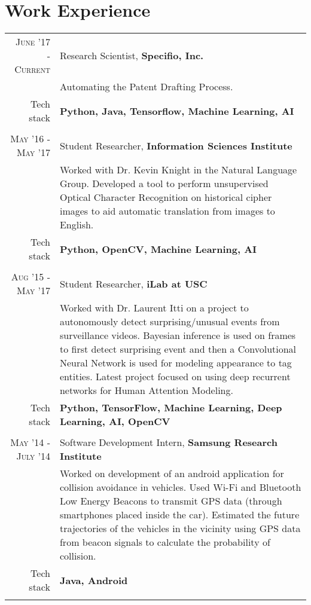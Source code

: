 \section{Work Experience}
\renewcommand{\arraystretch}{0.85}%
\begin{tabular}{r|p{13cm}}
\textsc{June '17 - Current} & Research Scientist, \textbf{Specifio, Inc.} \\
& \small{Automating the Patent Drafting Process.}\\
\small{Tech stack} &\footnotesize{\textbf{Python, Java, Tensorflow, Machine Learning, AI}} \\
\multicolumn{2}{c}{} \\

\textsc{May '16 - May '17} & Student Researcher, \textbf{Information Sciences Institute} \\
& \small{Worked with Dr. Kevin Knight in the Natural Language Group. Developed a tool to perform unsupervised Optical Character Recognition on historical cipher images to aid automatic translation from images to English.}\\
\small{Tech stack} &\footnotesize{\textbf{Python, OpenCV, Machine Learning, AI}} \\
\multicolumn{2}{c}{} \\

\textsc{Aug '15 - May '17} & Student Researcher, \textbf{iLab at USC} \\
& \small{Worked with Dr. Laurent Itti on a project to autonomously detect surprising/unusual events from surveillance videos. Bayesian inference is used on frames to first detect surprising event and then a Convolutional Neural Network is used for modeling appearance to tag entities. Latest project focused on using deep recurrent networks for Human Attention Modeling.}\\
\small{Tech stack} &\footnotesize{\textbf{Python, TensorFlow, Machine Learning, Deep Learning, AI, OpenCV}} \\
\multicolumn{2}{c}{} \\

\textsc{May '14 - July '14 } & Software Development Intern, \textbf{Samsung Research Institute} \\
& \small{Worked on development of an android application for collision avoidance in vehicles. Used Wi-Fi and Bluetooth Low Energy Beacons to transmit GPS data (through smartphones placed inside the car). Estimated the future trajectories of the vehicles in the vicinity using GPS data from beacon signals to calculate the probability of collision.}\\
\small{Tech stack} &\footnotesize{\textbf{Java, Android}} \\
\multicolumn{2}{c}{}


\end{tabular}
